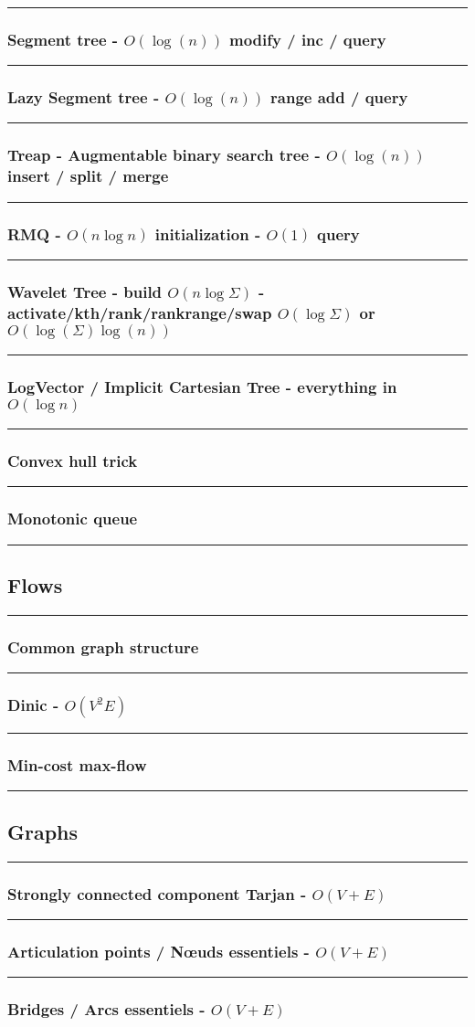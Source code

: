 \documentclass[landscape,a4paper,twocolumn,10pt]{report}
\renewcommand{\line}{\noindent\rule{\linewidth}{1pt}}
\newcommand{\algosection}[1]{\line \subsection*{#1}}
\newcommand{\algorithm}[1]{\line \subsubsection*{#1}}
\begin{document}
\algorithm{Segment tree - $O(\log(n))$ modify / inc / query}


\algorithm{Lazy Segment tree - $O(\log(n))$ range add / query}


\algorithm{Treap - Augmentable binary search tree - $O(\log(n))$ insert / split / merge}


%

\algorithm{RMQ - $O(n \log n)$ initialization - $O(1)$ query}


\algorithm{Wavelet Tree - build $O(n \log \Sigma)$ - activate/kth/rank/rankrange/swap $O(\log \Sigma)$ or $O(\log(\Sigma) \log(n))$}


\algorithm{LogVector / Implicit Cartesian Tree - everything in $O(\log n)$}


\algorithm{Convex hull trick}


\algorithm{Monotonic queue}


\algosection{Flows}
\label{flows}

\algorithm{Common graph structure}


\algorithm{Dinic - $O(V^2 E)$}


% 

\algorithm{Min-cost max-flow}



\algosection{Graphs}
\label{graphs}

\algorithm{Strongly connected component Tarjan - $O(V + E)$}


%

\algorithm{Articulation points / N\oe uds essentiels - $O(V + E)$}


\algorithm{Bridges / Arcs essentiels - $O(V + E)$}

\end{document}
